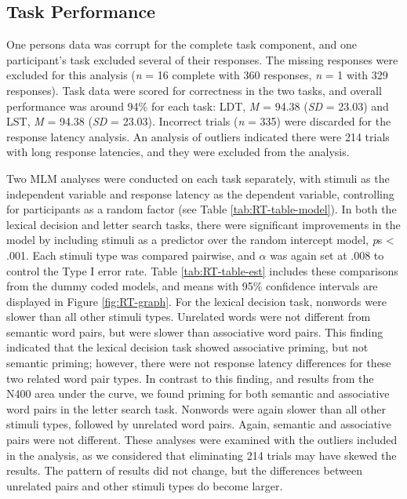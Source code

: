 \documentclass[english,man]{apa6}
\theoremstyle{definition}
\theoremstyle{definition}
\theoremstyle{definition}
\theoremstyle{remark}
\begin{document}
\subsection{Task Performance}\label{task-performance}

One persons data was corrupt for the complete task component, and one
participant's task excluded several of their responses. The missing
responses were excluded for this analysis (\emph{n} = 16 complete with
360 responses, \emph{n} = 1 with 329 responses). Task data were scored
for correctness in the two tasks, and overall performance was around
94\% for each task: LDT, \emph{M} = 94.38 (\emph{SD} = 23.03) and LST,
\emph{M} = 94.38 (\emph{SD} = 23.03). Incorrect trials (\emph{n} = 335)
were discarded for the response latency analysis. An analysis of
outliers indicated there were 214 trials with long response latencies,
and they were excluded from the analysis.

Two MLM analyses were conducted on each task separately, with stimuli as
the independent variable and response latency as the dependent variable,
controlling for participants as a random factor (see Table
\ref{tab:RT-table-model}). In both the lexical decision and letter
search tasks, there were significant improvements in the model by
including stimuli as a predictor over the random intercept model,
\emph{p}s \textless{} .001. Each stimuli type was compared pairwise, and
\(\alpha\) was again set at .008 to control the Type I error rate. Table
\ref{tab:RT-table-est} includes these comparisons from the dummy coded
models, and means with 95\% confidence intervals are displayed in Figure
\ref{fig:RT-graph}. For the lexical decision task, nonwords were slower
than all other stimuli types. Unrelated words were not different from
semantic word pairs, but were slower than associative word pairs. This
finding indicated that the lexical decision task showed associative
priming, but not semantic priming; however, there were not response
latency differences for these two related word pair types. In contrast
to this finding, and results from the N400 area under the curve, we
found priming for both semantic and associative word pairs in the letter
search task. Nonwords were again slower than all other stimuli types,
followed by unrelated word pairs. Again, semantic and associative pairs
were not different. These analyses were examined with the outliers
included in the analysis, as we considered that eliminating 214 trials
may have skewed the results. The pattern of results did not change, but
the differences between unrelated pairs and other stimuli types do
become larger.
\end{document}
